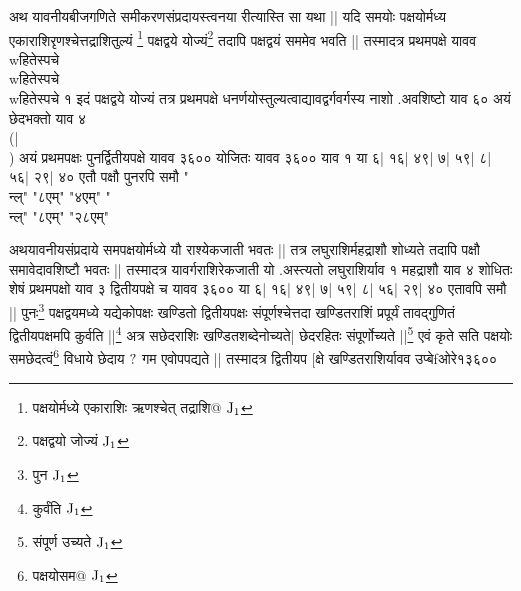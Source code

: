\documentclass[12pt]{article}
\begin{document}
{अथ यावनीयबीजगणिते समीकरणसंप्रदायस्त्वनया रीत्यास्ति
सा यथा ||
यदि समयोः पक्षयोर्मध्य एकाराशिरृण\-श्चेत्तद्राशितुल्यं
\footnote{{\s पक्षयोर्मध्ये एकाराशिः ऋणश्चेत् तद्राशि@ }${\rm J_1}$}
पक्षद्वये योज्यं\footnote{{\s पक्षद्वयो जोज्यं }${\rm J_1}$}
तदापि पक्षद्वयं सममेव भवति ||
तस्मादत्र प्रथमपक्षे यावव \\wहितेस्पचे\\wहितेस्पचे\\wहितेस्पचे
१ 
इदं पक्षद्वये योज्यं तत्र प्रथमपक्षे
धनर्णयोस्तुल्यत्वाद्यावद्वर्गवर्गस्य नाशो .अवशिष्टो
याव ६०
अयं छेदभक्तो याव ४\\(|\\) अयं प्रथमपक्षः पुनर्द्वितीयपक्षे
यावव ३६०० योजितः यावव ३६००
याव १ या ६| १६| ४९| ७| ५९| ८| ५६| २९| ४०
एतौ पक्षौ पुनरपि समौ
"\\न्ल्"
"{८एम्}"
"{४एम्}"
"\\न्ल्"
"{८एम्}"
"{२८एम्}"

अथयावनीयसंप्रदाये समपक्षयोर्मध्ये यौ
राश्येकजाती भवतः ||
तत्र लघुराशिर्महद्राशौ शोध्यते तदापि पक्षौ समावेदावशिष्टौ
भवतः ||
तस्मादत्र यावर्गराशिरेकजाती यो .अस्त्यतो लघुराशिर्याव १
महद्राशौ याव ४ शोधितः शेषं प्रथमपक्षो याव ३
द्वितीयपक्षे च यावव ३६००
या ६| १६| ४९| ७| ५९| ८| ५६| २९| ४०
एतावपि समौ ||
पुनः\footnote{{\s पुन } ${\rm J_1}$}
पक्षद्वयमध्ये यद्येकोपक्षः खण्डितो द्वितीयपक्षः
संपूर्णश्चेत्तदा खण्डितराशिं प्रपूर्यं
तावद्गुणितं द्वितीयपक्षमपि
कुर्वति ||\footnote{{\s कुर्वंति }${\rm J_1}$}
अत्र सछेदराशिः खण्डितशब्देनोच्यते|
छेदरहितः संपूर्णोच्यते ||\footnote{{\s संपूर्ण उच्यते }${\rm J_1}$}
एवं कृते सति पक्षयोः समछेदत्वं\footnote{{\s पक्षयोसम@ }${\rm J_1}$}
विधाये छेदाय ${\rm ?}$
गम एवोपपद्यते ||
तस्मादत्र द्वितीयप [क्षे  
खण्डितराशिर्यावव उप्बेfओरे{१}३६००



}
\end{document}
